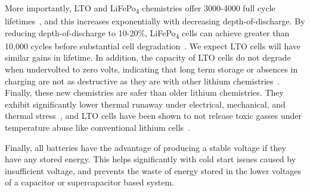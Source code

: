 More importantly, LTO
and LiFePo\textsubscript{4} chemistries offer 3000-4000 full cycle
lifetimes~\cite{LTODatasheet, omarLithium14, wangCycle11}, and this increases
exponentially with decreasing depth-of-discharge. By reducing
depth-of-discharge to 10-20\%, LiFePo\textsubscript{4} cells can achieve
greater than 10,000 cycles before substantial cell degradation~\cite{wangCycle11,
omarLithium14}. We expect LTO cells will have similar gains in
lifetime. In addition, the capacity of LTO cells do not
degrade when undervolted to zero volts, indicating that long term storage or
absences in charging are not as destructive as they are with other lithium
chemistries~\cite{brunell2016effect}. Finally, these new chemistries are
safer than older lithium chemistries. They
exhibit significantly lower thermal runaway under electrical, mechanical, and
thermal stress~\cite{belharouakElectrochemistry11, larssonAbuse14}, and LTO
cells have been shown to not release toxic gasses under temperature abuse like
conventional lithium cells~\cite{belharouakElectrochemistry11}.

Finally, all batteries have the advantage of producing a stable voltage if
they have any stored energy. This helps significantly with cold start issues
caused by insufficient voltage,
and prevents the waste of energy stored in the lower voltages of a capacitor
or supercapacitor based system.

